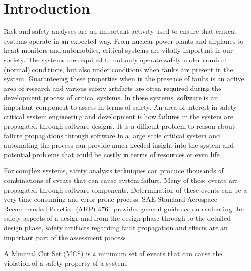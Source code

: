 \section{Introduction}
\label{sec:intro}

Risk and safety analyses are an important activity used to ensure that critical systems operate in an expected way. From nuclear power plants and airplanes to heart monitors and automobiles, critical systems are vitally important in our society. The systems are required to not only operate safely under nominal (normal) conditions, but also under conditions when faults are present in the system. Guaranteeing these properties when in the presence of faults is an active area of research and various safety artifacts are often required during the development process of critical systems. In these systems, software is an important component to assess in terms of safety. An area of interest in safety-critical system engineering and development is how failures in the system are propagated through software designs. It is a difficult problem to reason about failure propagations through software in a large scale critical system and automating the process can provide much needed insight into the system and potential problems that could be costly in terms of resources or even life. 

 For complex systems, safety analysis techniques can produce thousands of combinations of events that can cause system failure. Many of these events are propagated through software components. Determination of these events can be a very time consuming and error prone process. SAE Standard Aerospace Recommended Practice (ARP) 4761 provides general guidance on evaluating the safety aspects of a design and from the design phase through to the detailed design phase, safety artifacts regarding fault propagation and effects are an important part of the assessment process~\cite{SAE:ARP4761}. 

A Minimal Cut Set (MCS) is a minimum set of events that can cause the violation of a safety property of a system. 



